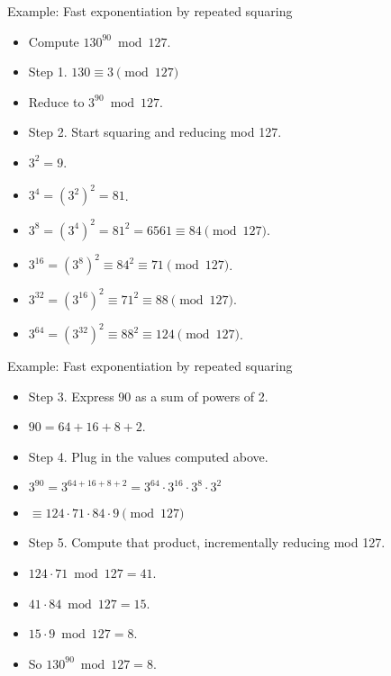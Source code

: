 \documentclass[handout]{beamer}
\begin{document}
\begin{frame}{Example: Fast exponentiation by repeated squaring}
\begin{itemize}
  \item Compute $130^{90} \bmod 127$.
  \item Step 1. $130 \equiv 3 \pmod {127}$
  \item Reduce to $3^{90} \bmod 127$.
  \item Step 2. Start squaring and reducing mod 127.
  \item $3^2 = 9$.
  \item $3^4 = (3^2)^2 = 81$.
  \item $3^{8} = (3^4)^2 = 81^2 = 6561   \equiv 84  \pmod {127}$.
  \item $3^{16} = (3^{8})^2 \equiv 84^2  \equiv 71  \pmod {127}$.
  \item $3^{32} = (3^{16})^2 \equiv 71^2 \equiv 88  \pmod {127}$.
  \item $3^{64} = (3^{32})^2 \equiv 88^2 \equiv 124 \pmod {127}$.
\end{itemize}
\end{frame}

\begin{frame}{Example: Fast exponentiation by repeated squaring}
\begin{itemize}
  \item Step 3. Express 90 as a sum of powers of 2.
  \item $90 = 64+16+8+2$.
  \item Step 4. Plug in the values computed above.
  \item $3^{90} = 3^{64+16+8+2} = 3^{64} \cdot 3^{16} \cdot 3^{8} \cdot 3^{2}$
  \item $\equiv 124 \cdot 71 \cdot 84 \cdot 9  \pmod {127}$
  \item Step 5. Compute that product, incrementally reducing mod 127.
  \item $124 \cdot 71 \bmod 127 = 41$.
  \item $41 \cdot 84 \bmod 127 = 15$.
  \item $15 \cdot 9 \bmod 127 = 8$.
  \item So $130^{90} \bmod 127 = 8$.
\end{itemize}
\end{frame}
\end{document}
